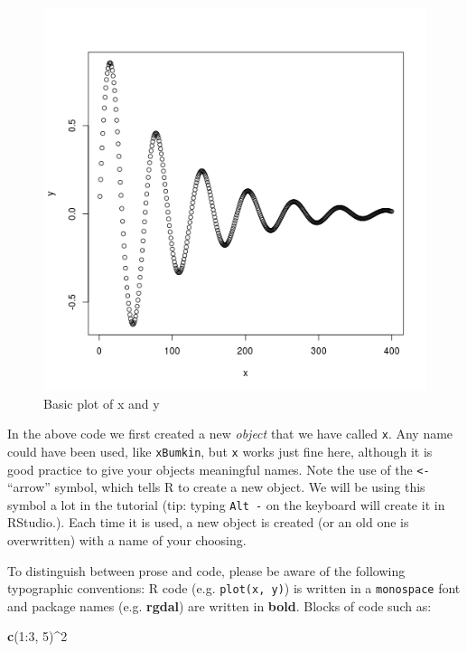 \documentclass[]{article}
\newenvironment{Shaded}{}{}
\newcommand{\KeywordTok}[1]{\textcolor[rgb]{0.00,0.44,0.13}{\textbf{{#1}}}}
\newcommand{\DecValTok}[1]{\textcolor[rgb]{0.25,0.63,0.44}{{#1}}}
\newcommand{\NormalTok}[1]{{#1}}
\begin{document}
\begin{figure}[htbp]
\centering
\includegraphics{figure/Basic_plot_of_x_and_y.png}
\caption{Basic plot of x and y}
\end{figure}

In the above code we first created a new \emph{object} that we have
called \texttt{x}. Any name could have been used, like \texttt{xBumkin},
but \texttt{x} works just fine here, although it is good practice to
give your objects meaningful names. Note the use of the
\texttt{\textless{}-} ``arrow'' symbol, which tells R to create a new
object. We will be using this symbol a lot in the tutorial (tip: typing
\texttt{Alt -} on the keyboard will create it in RStudio.). Each time it
is used, a new object is created (or an old one is overwritten) with a
name of your choosing.

To distinguish between prose and code, please be aware of the following
typographic conventions: R code (e.g. \texttt{plot(x, y)}) is written in
a \texttt{monospace} font and package names (e.g. \textbf{rgdal}) are
written in \textbf{bold}. Blocks of code such as:

\begin{Shaded}
\begin{Highlighting}[]
\KeywordTok{c}\NormalTok{(}\DecValTok{1}\NormalTok{:}\DecValTok{3}\NormalTok{, }\DecValTok{5}\NormalTok{)^}\DecValTok{2}
\end{Highlighting}
\end{Shaded}
\end{document}
